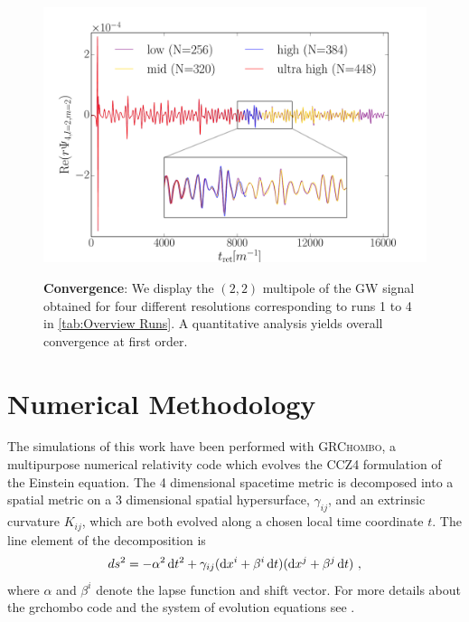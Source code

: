 \documentclass[aps,twocolumn,nofootinbib,superscriptaddress,amsfonts,floatfix
]{revtex4-1} %
\newcommand{\grchombo}{\textsc{GRChombo}\xspace}
\begin{document}
\clearpage \appendix
\begin{figure}[t]
\begin{center}
{\includegraphics[width=1.0\columnwidth]{Convergence.pdf}}
\caption{{\bf Convergence}: We display the $(2,2)$ multipole
of the GW signal obtained for four different resolutions
corresponding to runs 1 to 4 in \cref{tab:Overview Runs}.
A quantitative analysis yields overall convergence at
first order.
    }
\label{fig:Convergence}
\end{center}
\end{figure}
\section{Numerical Methodology}\label{appendix:numerical_methodology}

The simulations of this work have been performed with
\grchombo, a multipurpose numerical relativity code
\cite{Andrade:2021rbd,Radia:2021smk,Clough:2015sqa} which evolves the CCZ4 \cite{Gundlach:2005eh,Alic:2011gg}
formulation of the Einstein equation. The 4 dimensional spacetime metric is
decomposed into a spatial metric on a 3 dimensional spatial hypersurface,
$\gamma_{ij}$, and an extrinsic curvature $K_{ij}$, which are both evolved along
a chosen local time coordinate $t$. The line element of the decomposition is
\begin{equation}
ds^2=-\alpha^2\,{\rm d}t^2+\gamma_{ij}({\rm d}x^i + \beta^i\,{\rm d}t)({\rm d}x^j + \beta^j\,{\rm d}t)~,
\end{equation}
where $\alpha$ and $\beta^i$ denote the lapse function and shift vector. For more details about the {\sc grchombo} code and the
system of evolution equations see \cite{Radia:2021smk,Andrade:2021rbd}.
\end{document}

